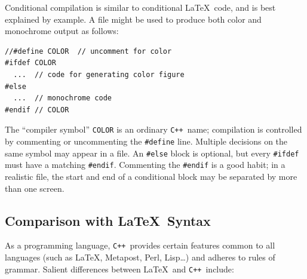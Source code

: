 \documentclass[12pt]{report}
\newcommand{\code}[1]{\texttt{#1}}
\newcommand{\CXX}{\code{C++}}
\begin{document}
Conditional compilation is similar to conditional \LaTeX\ code, and is
best explained by example. A file might be used to produce both color
and monochrome output as follows:
\begin{verbatim}
//#define COLOR  // uncomment for color
#ifdef COLOR
  ...  // code for generating color figure
#else
  ...  // monochrome code
#endif // COLOR
\end{verbatim}
The ``compiler symbol'' \code{COLOR} is an ordinary \CXX\ name;
compilation is controlled by commenting or uncommenting the
\code{\#define} line. Multiple decisions on the same symbol may appear
in a file. An \code{\#else} block is optional, but every
\code{\#ifdef} must have a matching \code{\#endif}. Commenting the
\code{\#endif} is a good habit; in a realistic file, the start and end
of a conditional block may be separated by more than one screen.


\subsection*{Comparison with \LaTeX\ Syntax}

As a programming language, \CXX\ provides certain features common to
all languages (such as \LaTeX, Metapost, Perl, Lisp\ldots) and adheres
to rules of grammar. Salient differences between \LaTeX\ and \CXX\ 
include:
\end{document}
